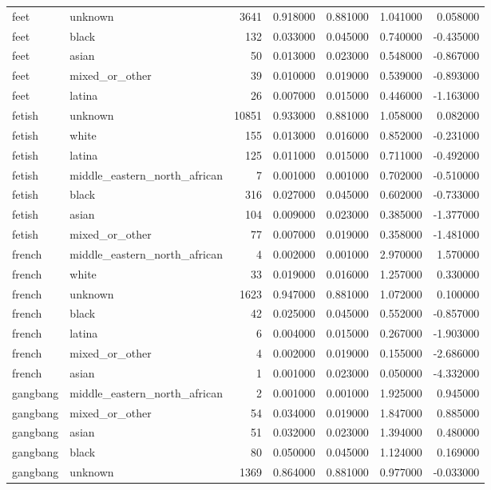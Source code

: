 \begin{tabular}{llrrrrr}
feet & unknown & 3641 & 0.918000 & 0.881000 & 1.041000 & 0.058000 \\
feet & black & 132 & 0.033000 & 0.045000 & 0.740000 & -0.435000 \\
feet & asian & 50 & 0.013000 & 0.023000 & 0.548000 & -0.867000 \\
feet & mixed_or_other & 39 & 0.010000 & 0.019000 & 0.539000 & -0.893000 \\
feet & latina & 26 & 0.007000 & 0.015000 & 0.446000 & -1.163000 \\
fetish & unknown & 10851 & 0.933000 & 0.881000 & 1.058000 & 0.082000 \\
fetish & white & 155 & 0.013000 & 0.016000 & 0.852000 & -0.231000 \\
fetish & latina & 125 & 0.011000 & 0.015000 & 0.711000 & -0.492000 \\
fetish & middle_eastern_north_african & 7 & 0.001000 & 0.001000 & 0.702000 & -0.510000 \\
fetish & black & 316 & 0.027000 & 0.045000 & 0.602000 & -0.733000 \\
fetish & asian & 104 & 0.009000 & 0.023000 & 0.385000 & -1.377000 \\
fetish & mixed_or_other & 77 & 0.007000 & 0.019000 & 0.358000 & -1.481000 \\
french & middle_eastern_north_african & 4 & 0.002000 & 0.001000 & 2.970000 & 1.570000 \\
french & white & 33 & 0.019000 & 0.016000 & 1.257000 & 0.330000 \\
french & unknown & 1623 & 0.947000 & 0.881000 & 1.072000 & 0.100000 \\
french & black & 42 & 0.025000 & 0.045000 & 0.552000 & -0.857000 \\
french & latina & 6 & 0.004000 & 0.015000 & 0.267000 & -1.903000 \\
french & mixed_or_other & 4 & 0.002000 & 0.019000 & 0.155000 & -2.686000 \\
french & asian & 1 & 0.001000 & 0.023000 & 0.050000 & -4.332000 \\
gangbang & middle_eastern_north_african & 2 & 0.001000 & 0.001000 & 1.925000 & 0.945000 \\
gangbang & mixed_or_other & 54 & 0.034000 & 0.019000 & 1.847000 & 0.885000 \\
gangbang & asian & 51 & 0.032000 & 0.023000 & 1.394000 & 0.480000 \\
gangbang & black & 80 & 0.050000 & 0.045000 & 1.124000 & 0.169000 \\
gangbang & unknown & 1369 & 0.864000 & 0.881000 & 0.977000 & -0.033000 \\

\end{tabular}
